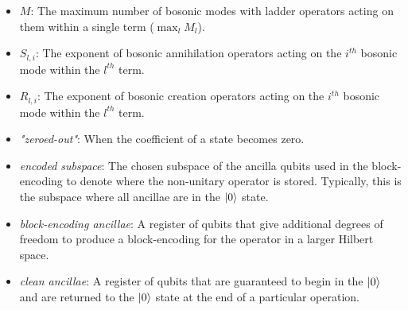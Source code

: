 \begin{itemize}
    \item $M$: The maximum number of bosonic modes with ladder operators acting on them within a single term ($\max_l M_l$).
    \item $S_{l, i}$: The exponent of bosonic annihilation operators acting on the $i^{th}$ bosonic mode within the $l^{th}$ term.
    \item $R_{l, i}$: The exponent of bosonic creation operators acting on the $i^{th}$ bosonic mode within the $l^{th}$ term.
    \item \textit{"zeroed-out"}: When the coefficient of a state becomes zero.
    \item \textit{encoded subspace}: The chosen subspace of the ancilla qubits used in the block-encoding to denote where the non-unitary operator is stored. Typically, this is the subspace where all ancillae are in the $\ket{0}$ state.
    \item \textit{block-encoding ancillae}: A register of qubits that give additional degrees of freedom to produce a block-encoding for the operator in a larger Hilbert space.
    \item \textit{clean ancillae}: A register of qubits that are guaranteed to begin in the $\ket{0}$ and are returned to the $\ket{0}$ state at the end of a particular operation. 
\end{itemize}